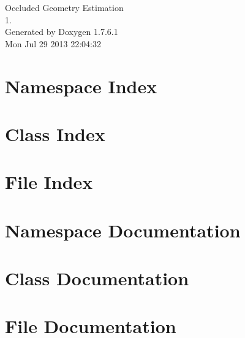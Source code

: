 \documentclass[a4paper]{book}
\begin{document}
\hypersetup{pageanchor=false,citecolor=blue}
\begin{titlepage}
\vspace*{7cm}
\begin{center}
{\Large \-Occluded \-Geometry \-Estimation \\[1ex]\large 1. }\\
\vspace*{1cm}
{\large \-Generated by Doxygen 1.7.6.1}\\
\vspace*{0.5cm}
{\small Mon Jul 29 2013 22:04:32}\\
\end{center}
\end{titlepage}
\clearemptydoublepage
{}
\tableofcontents
\clearemptydoublepage
{}
\hypersetup{pageanchor=true,citecolor=blue}
\chapter{\-Namespace \-Index}

\chapter{\-Class \-Index}

\chapter{\-File \-Index}

\chapter{\-Namespace \-Documentation}


\chapter{\-Class \-Documentation}





\chapter{\-File \-Documentation}












\printindex
\end{document}
